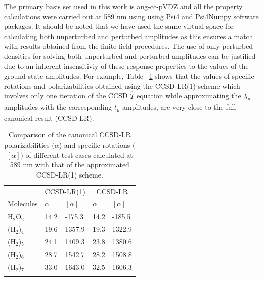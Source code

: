 The primary basis set used in this work is aug-cc-pVDZ\cite{Dunning89,Kendall92,Woon94}
and all the property calculations were carried out at 589 nm using 
using Psi4 and Psi4Numpy software packages.\cite{Parrish17, Smith18}
It should be noted that we have used the same virtual space for calculating both unperturbed
and perturbed amplitudes as this ensures a match with results obtained from
the finite-field procedures. The use of only perturbed densities for solving 
both unperturbed and perturbed amplitudes can be justified due to an inherent
insensitiviy of these response properties to the values of the ground state amplitudes.
For example, Table ~\ref{cclr_justify} shows that the values of specific rotations and polarizabilities 
obtained using the CCSD-LR(1) scheme which involves only one iteration of the CCSD $\hat{T}$ equation while 
approximating the $\lambda_\mu$ amplitudes with the corresponding $t_\mu$ amplitudes, are very close to 
the full canonical result (CCSD-LR).
 \begin{table}[h]
 \caption{Comparison of the canonical CCSD-LR polarizabilities ($\alpha$) and specific rotations ($[\alpha]$) of different test cases 
calculated at 589 nm with that of the approximated CCSD-LR(1) scheme.}
\centering
\begin{tabular}{lllll}
\hline
 & \multicolumn{2}{c}{CCSD-LR(1)} & \multicolumn{2}{c}{CCSD-LR} \\
\cline{2-5}
 Molecules & $\alpha$ & $[\alpha]$ & $\alpha$ & $[\alpha]$ \\ %
\hline
H$_2$O$_2$  & 14.2 & -175.3 &  14.2 &  -185.5   \\
\hline
(H$_2$)$_4$ & 19.6 & 1357.9 &  19.3 &  1322.9 \\
\hline
(H$_2$)$_5$ & 24.1  & 1409.3 & 23.8 &  1380.6  \\
\hline
(H$_2$)$_6$ & 28.7 & 1542.7 & 28.2 &   1508.8 \\
\hline
(H$_2$)$_7$ & 33.0 & 1643.0 & 32.5 &   1606.3  \\
\hline
\\
\end{tabular}
\label{cclr_justify}
\end{table}

